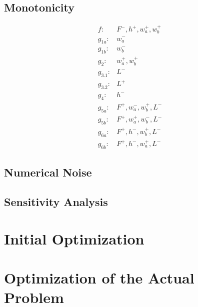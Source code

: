 \subsection{Monotonicity}
\begin{align}
	f: & F^-, h^+, w_a^+, w_b^+ \\
	g_{1a}:& w_a^- \\
	g_{1b}:& w_b^- \\
	g_{2}:& w_a^+, w_b^+\\
	g_{3.1}:& L^- \\
	g_{3.2}:& L^+ \\
	g_{4}:& h^-\\
	g_{5a}:& F^+, w_a^-, w_b^+, L^- \\
	g_{5b}:& F^+, w_a^+, w_b^-, L^-\\
	g_{6a}:& F^+, h^-, w_b^+, L^-\\
	g_{6b}:& F^+, h^-, w_a^+, L^-
\end{align}

\subsection{Numerical Noise}

\subsection{Sensitivity Analysis}



\section{Initial Optimization}

\section{Optimization of the Actual Problem}

